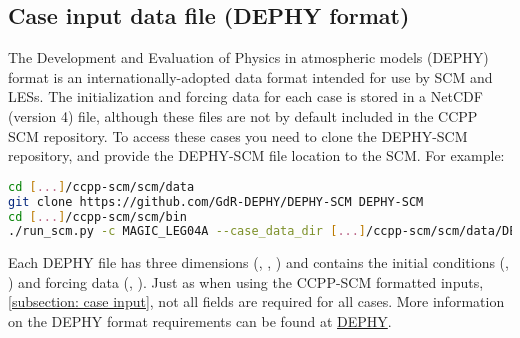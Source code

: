 

\subsection{Case input data file (DEPHY format)}
\label{subsection: case input dephy}
The Development and Evaluation of Physics in atmospheric models (DEPHY) format is an internationally-adopted data format intended for use by SCM and LESs. The initialization and forcing data for each case is stored in a NetCDF (version 4) file, although these files are not by default included in the CCPP SCM repository. To access these cases you need to clone the DEPHY-SCM repository, and provide the DEPHY-SCM file location to the SCM. For example:
\begin{lstlisting}[language=bash]
cd [...]/ccpp-scm/scm/data
git clone https://github.com/GdR-DEPHY/DEPHY-SCM DEPHY-SCM
cd [...]/ccpp-scm/scm/bin
./run_scm.py -c MAGIC_LEG04A --case_data_dir [...]/ccpp-scm/scm/data/DEPHY-SCM/MAGIC/LEG04A -v
\end{lstlisting}
Each DEPHY file has three dimensions (, , ) and contains the initial conditions (, ) and forcing data (, ). Just as when using the CCPP-SCM formatted inputs, \ref{subsection: case input}, not all fields are required for all cases. More information on the DEPHY format requirements can be found at \href{https://github.com/GdR-DEPHY/DEPHY-SCM}{DEPHY}. 




